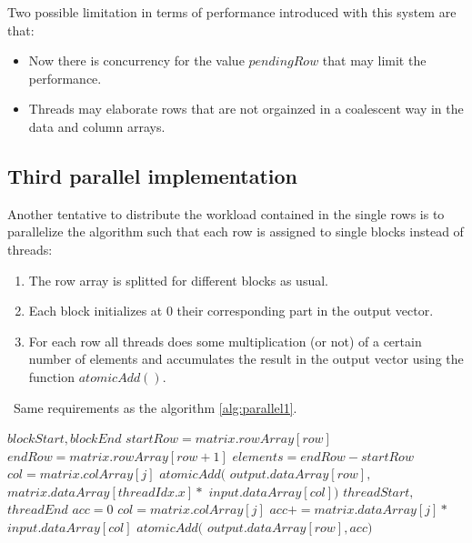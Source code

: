 \documentclass[conference]{IEEEtran}
\begin{document}
Two possible limitation in terms of performance introduced with this system are that:
\begin{itemize}
    \item Now there is concurrency for the value $pendingRow$ that may limit the performance. 
    \item Threads may elaborate rows that are not orgainzed in a coalescent way in the data and column arrays. 
\end{itemize}

\subsection{Third parallel implementation}
Another tentative to distribute the workload contained in the single rows is to parallelize the algorithm such that each row is assigned to 
single blocks instead of threads:
\begin{enumerate}
    \item The row array is splitted for different blocks as usual. 
    \item Each block initializes at 0 their corresponding part in the output vector. 
    \item For each row all threads does some multiplication (or not) of a certain number of elements and accumulates the result in the output vector using the function $atomicAdd()$. 
\end{enumerate}

\begin{algorithm}[h!]
\caption{Second parallelization for the SpVM algorithm}
\algorithmicrequire~Same requirements as the algorithm \ref{alg:parallel1}.
\begin{algorithmic}[1]
\State $blockStart,blockEnd$ 
\State \text{\dots}
\State $startRow=matrix.rowArray[row]$
\State $endRow=matrix.rowArray[row+1]$
\State $elements=endRow-startRow$
\State $col=matrix.colArray[j]$
\State $atomicAdd($
\State $output.dataArray[row],$
\State $matrix.dataArray[threadIdx.x]*$
\State $input.dataArray[col])$
\Else 
\State $threadStart,$
\State $threadEnd$ 
\State $acc=0$
\State $col=matrix.colArray[j]$
\State $acc+=matrix.dataArray[j]*$
\State $input.dataArray[col]$
\EndFor
\State $atomicAdd($
\State $output.dataArray[row],acc)$
\EndIf
\EndFor
\EndProcedure
\end{algorithmic}
\label{alg:parallel3}
\end{algorithm}
\end{document}
